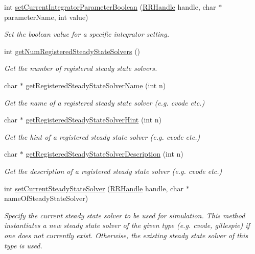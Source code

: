 \begin{DoxyCompactItemize}
int \hyperlink{group__simopts_gab89192771385f30f5223756c46bda227}{set\+Current\+Integrator\+Parameter\+Boolean} (\hyperlink{rrc__types_8h_a1d68f0592372208fa5a5f2799ea4b3ae}{R\+R\+Handle} handle, char $\ast$parameter\+Name, int value)
\begin{DoxyCompactList}\small\item\em Set the boolean value for a specific integrator setting. \end{DoxyCompactList}\item 
int \hyperlink{group__simopts_ga210bf6ea10e2c17023a4f108833680e7}{get\+Num\+Registered\+Steady\+State\+Solvers} ()
\begin{DoxyCompactList}\small\item\em Get the number of registered steady state solvers. \end{DoxyCompactList}\item 
char $\ast$ \hyperlink{group__simopts_gae4dfba532a52cfdd6011355a2a48fdd0}{get\+Registered\+Steady\+State\+Solver\+Name} (int n)
\begin{DoxyCompactList}\small\item\em Get the name of a registered steady state solver (e.\+g. cvode etc.) \end{DoxyCompactList}\item 
char $\ast$ \hyperlink{group__simopts_gaf6ac4275f7bc0967d420f15377b189a6}{get\+Registered\+Steady\+State\+Solver\+Hint} (int n)
\begin{DoxyCompactList}\small\item\em Get the hint of a registered steady state solver (e.\+g. cvode etc.) \end{DoxyCompactList}\item 
char $\ast$ \hyperlink{group__simopts_ga090a38a435c4819945e8fc7724ff68f2}{get\+Registered\+Steady\+State\+Solver\+Description} (int n)
\begin{DoxyCompactList}\small\item\em Get the description of a registered steady state solver (e.\+g. cvode etc.) \end{DoxyCompactList}\item 
int \hyperlink{group__simopts_ga3f75fb22d03a7f532bedf31d45a791be}{set\+Current\+Steady\+State\+Solver} (\hyperlink{rrc__types_8h_a1d68f0592372208fa5a5f2799ea4b3ae}{R\+R\+Handle} handle, char $\ast$name\+Of\+Steady\+State\+Solver)
\begin{DoxyCompactList}\small\item\em Specify the current steady state solver to be used for simulation.  This method instantiates a new steady state solver of the given type (e.\+g. cvode, gillespie) if one does not currently exist. Otherwise, the existing steady state solver of this type is used. \end{DoxyCompactList}\item 

\end{DoxyCompactItemize}
